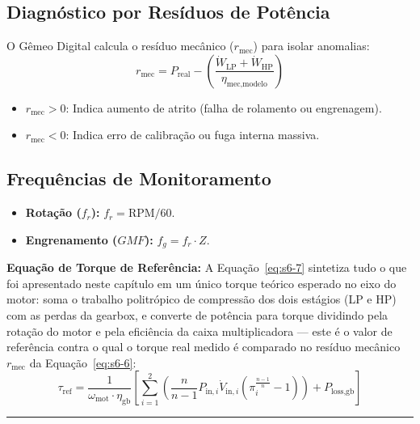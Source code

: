\documentclass[12pt,a4paper]{article}
\numberwithin{equation}{section}
\numberwithin{table}{section}
\numberwithin{figure}{section}
\begin{document}
	\subsection{\textbf{Diagnóstico por Resíduos de Potência}}
	O Gêmeo Digital calcula o resíduo mecânico ($r_{\text{mec}}$) para isolar anomalias:
	\begin{equation}\label{eq:s6-6}
 r_{\text{mec}} = P_{\text{real}} - \left( \frac{\dot{W}_{\text{LP}} + \dot{W}_{\text{HP}}}{\eta_{\text{mec,modelo}}} \right) 
\end{equation}
	\begin{itemize}
		\item $r_{\text{mec}} > 0$: Indica aumento de atrito (falha de rolamento ou engrenagem).
		\item $r_{\text{mec}} < 0$: Indica erro de calibração ou fuga interna massiva.
	\end{itemize}
	
	\subsection{\textbf{Frequências de Monitoramento}}
	\begin{itemize}
		\item \textbf{Rotação ($f_r$):} $f_r = \text{RPM} / 60$.
		\item \textbf{Engrenamento ($GMF$):} $f_g = f_r \cdot Z$.
	\end{itemize}
	
	\vspace{1em}
	\textbf{Equação de Torque de Referência:} A Equação~\eqref{eq:s6-7} sintetiza tudo o que foi apresentado neste capítulo em um único torque teórico esperado no eixo do motor: soma o trabalho politrópico de compressão dos dois estágios (LP e HP) com as perdas da gearbox, e converte de potência para torque dividindo pela rotação do motor e pela eficiência da caixa multiplicadora — este é o valor de referência contra o qual o torque real medido é comparado no resíduo mecânico $r_{\text{mec}}$ da Equação~\eqref{eq:s6-6}:
	\begin{equation}\label{eq:s6-7}
 \boxed{\tau_{\text{ref}} = \frac{1}{\omega_{\text{mot}} \cdot \eta_{\text{gb}}} \left[ \sum_{i=1}^{2} \left( \frac{n}{n-1} P_{\text{in},i} \dot{V}_{\text{in},i} \left( \pi_i^{\frac{n-1}{n}} - 1 \right) \right) + P_{\text{loss,gb}} \right]}
\end{equation}

	\vspace{1em}
	\hrule
	\vspace{1em}
\end{document}
